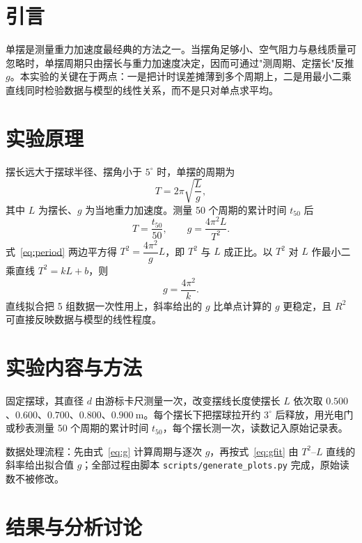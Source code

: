 \documentclass{thuemp}
\begin{document}
\wuhao
\section{引言}

\enlargethispage{-3.3cm}

单摆是测量重力加速度最经典的方法之一\cite{qian2019}。当摆角足够小、空气阻力与悬线质量可忽略时，单摆周期只由摆长与重力加速度决定，因而可通过"测周期、定摆长"反推 $g$。本实验的关键在于两点：一是把计时误差摊薄到多个周期上，二是用最小二乘直线同时检验数据与模型的线性关系，而不是只对单点求平均\cite{lv2015}。
\section{实验原理}

摆长远大于摆球半径、摆角小于 $5^\circ$ 时，单摆的周期为
\begin{equation}
T=2\pi\sqrt{\frac{L}{g}},
\label{eq:period}
\end{equation}
其中 $L$ 为摆长、$g$ 为当地重力加速度。测量 50 个周期的累计时间 $t_{50}$ 后
\begin{equation}
T=\frac{t_{50}}{50},\qquad g=\frac{4\pi^{2}L}{T^{2}}.
\label{eq:g}
\end{equation}
式~\eqref{eq:period} 两边平方得 $T^{2}=\dfrac{4\pi^{2}}{g}L$，即 $T^{2}$ 与 $L$ 成正比。以 $T^{2}$ 对 $L$ 作最小二乘直线 $T^{2}=kL+b$，则
\begin{equation}
g=\frac{4\pi^{2}}{k}.
\label{eq:gfit}
\end{equation}
直线拟合把 5 组数据一次性用上，斜率给出的 $g$ 比单点计算的 $g$ 更稳定，且 $R^2$ 可直接反映数据与模型的线性程度。
\section{实验内容与方法}

固定摆球，其直径 $d$ 由游标卡尺测量一次，改变摆线长度使摆长 $L$ 依次取 $0.500$、$0.600$、$0.700$、$0.800$、$0.900\ \mathrm{m}$。每个摆长下把摆球拉开约 $3^\circ$ 后释放，用光电门或秒表测量 50 个周期的累计时间 $t_{50}$，每个摆长测一次，读数记入原始记录表。

数据处理流程：先由式~\eqref{eq:g} 计算周期与逐次 $g$，再按式~\eqref{eq:gfit} 由 $T^{2}$–$L$ 直线的斜率给出拟合值 $g$；全部过程由脚本 \verb|scripts/generate_plots.py| 完成，原始读数不被修改。
\section{结果与分析讨论}
\end{document}
